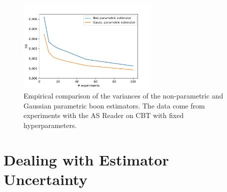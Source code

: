 \documentclass{article}
\newcommand{\tboon}{\gls{boon}\xspace}
\begin{document}
\begin{appendices}


\begin{figure} [ht]
        \centering
            \centering
            \includegraphics[width=0.6\textwidth]{figures/param_non_param_comparison.pdf}
        \caption[ NA ]{
        Empirical comparison of the variances of the non-parametric and Gaussian parametric \tboon estimators. The data come from experiments with the AS Reader on CBT with fixed hyperparameters.}
        \label{fig:estimator_comparison}
\end{figure}


\section{Dealing with Estimator Uncertainty}


\end{appendices}
\end{document}

